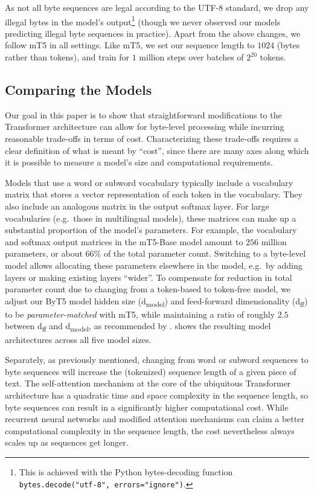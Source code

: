 \documentclass[11pt,a4paper]{article}
\begin{document}
As not all byte sequences are legal according to the \mbox{UTF-8} standard, we drop any illegal bytes in the model's output\footnote{This is achieved with the Python bytes-decoding function \texttt{bytes.decode("utf-8", errors="ignore")}.} (though we never observed our models predicting illegal byte sequences in practice). Apart from the above changes, we follow mT5 in all settings. Like mT5, we set our sequence length to $1024$ (bytes rather than tokens), and train for $1$ million steps over batches of $2^{20}$ tokens.

\subsection{Comparing the Models}

Our goal in this paper is to show that straightforward modifications to the Transformer architecture can allow for byte-level processing while incurring reasonable trade-offs in terms of cost.
Characterizing these trade-offs requires a clear definition of what is meant by ``cost'', since there are many axes along which it is possible to measure a model's size and computational requirements.



Models that use a word or subword vocabulary typically include a vocabulary matrix that stores a vector representation of each token in the vocabulary.
They also include an analogous matrix in the output softmax layer.
For large vocabularies (e.g.\ those in multilingual models), these matrices can make up a substantial proportion of the model's parameters.
For example, the vocabulary and softmax output matrices in the \mbox{mT5-Base} model amount to $256$ million parameters, or about 66\% of the total parameter count.
Switching to a byte-level model allows allocating these parameters elsewhere in the model, e.g.\ by adding layers or making existing layers ``wider''.
To compensate for reduction in total parameter count due to changing from a token-based to token-free model, we adjust our ByT5 model hidden size (d\textsubscript{model}) and feed-forward dimensionality (d\textsubscript{ff}) to be \textit{parameter-matched} with mT5, while maintaining a ratio of roughly $2.5$ between d\textsubscript{ff} and d\textsubscript{model}, as recommended by \citet{kaplan2020scaling}.
 shows the resulting model architectures across all five model sizes.

Separately, as previously mentioned, changing from word or subword sequences to byte sequences will increase the (tokenized) sequence length of a given piece of text.
The self-attention mechanism at the core of the ubiquitous Transformer architecture \cite{vaswani2017attention} has a quadratic time and space complexity in the sequence length, so byte sequences can result in a significantly higher computational cost.
While recurrent neural networks and modified attention mechanisms \cite{tay2020efficient} can claim a better computational complexity in the sequence length, the cost nevertheless always scales up as sequences get longer.
\end{document}
